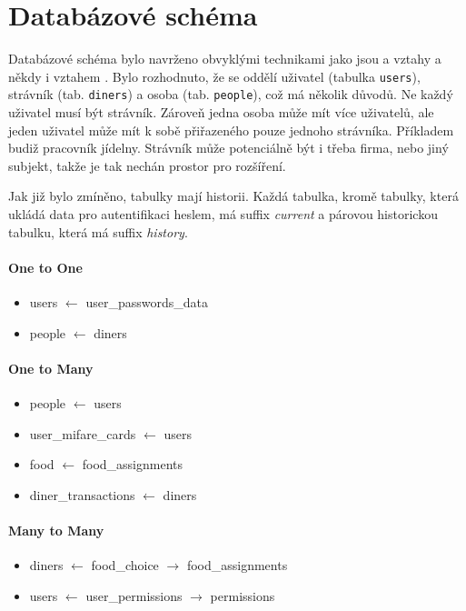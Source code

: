 \section{Databázové schéma}

Databázové schéma bylo navrženo obvyklými technikami jako jsou  a 
 vztahy a někdy i vztahem .
Bylo rozhodnuto, že se oddělí uživatel (tabulka \verb|users|),
strávník (tab. \verb|diners|) a osoba (tab. \verb|people|), 
což má několik důvodů. Ne každý uživatel musí být strávník.
Zároveň jedna osoba může mít více uživatelů, ale jeden uživatel
může mít k sobě přiřazeného pouze jednoho strávníka.
Příkladem budiž pracovník jídelny. Strávník může potenciálně být i třeba firma,
nebo jiný subjekt, takže je tak nechán prostor pro rozšíření.

Jak již bylo zmíněno, tabulky mají historii. Každá tabulka, kromě tabulky, která ukládá
data pro autentifikaci heslem, má suffix \emph{current} a párovou historickou tabulku,
která má suffix \emph{history}.

\paragraph{One to One}

\begin{itemize}
    \item users $\leftarrow$ user\_passwords\_data
    \item people $\leftarrow$ diners
\end{itemize}

\paragraph{One to Many}

\begin{itemize}
    \item people $\leftarrow$ users
    \item user\_mifare\_cards $\leftarrow$ users
    \item food $\leftarrow$ food\_assignments
    \item diner\_transactions $\leftarrow$ diners
\end{itemize}

\paragraph{Many to Many}

\begin{itemize}
    \item diners $\leftarrow$ food\_choice $\rightarrow$ food\_assignments
    \item users $\leftarrow$ user\_permissions $\rightarrow$ permissions
\end{itemize}

